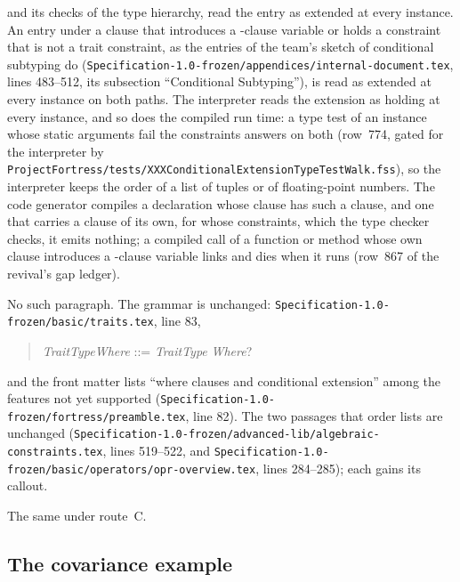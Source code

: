\begin{description}
and its checks of the type hierarchy, read the entry as extended at every
instance.
An entry under a clause that introduces a -clause variable or
holds a constraint that is not a trait constraint, as the entries of the
team's sketch of conditional subtyping do
(\nolinkurl{Specification-1.0-frozen/appendices/internal-document.tex},
lines 483--512, its subsection ``Conditional Subtyping''), is read as
extended at every instance on both paths.
The interpreter reads the extension as holding at every instance, and so
does the compiled run time: a type test of an instance whose static
arguments fail the constraints answers  on both
(row~774, gated for the interpreter by
\nolinkurl{ProjectFortress/tests/XXXConditionalExtensionTypeTestWalk.fss}),
so the interpreter keeps the order of a list of tuples or of floating-point
numbers.
The code generator compiles a declaration whose  clause has
such a clause, and one that carries a  clause of its own, for
whose constraints, which the type checker checks, it emits nothing; a compiled
call of a function or method whose own clause introduces a -clause
variable links and dies when it runs (row~867 of the revival's gap ledger).
\item[Original text] No such paragraph. The grammar is unchanged:
\nolinkurl{Specification-1.0-frozen/basic/traits.tex}, line 83,
\begin{quote}
\emph{TraitTypeWhere} ::= \emph{TraitType} \emph{Where}?
\end{quote}
and the front matter lists ``where clauses and conditional extension''
among the features not yet supported
(\nolinkurl{Specification-1.0-frozen/fortress/preamble.tex}, line 82).
The two passages that order lists are unchanged
(\nolinkurl{Specification-1.0-frozen/advanced-lib/algebraic-constraints.tex},
lines 519--522, and
\nolinkurl{Specification-1.0-frozen/basic/operators/opr-overview.tex},
lines 284--285); each gains its callout.
\item[Route C] The same under route~C.
\end{description}

\subsection{The covariance example}

